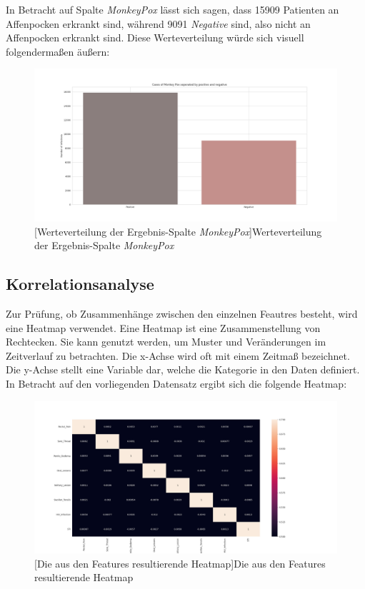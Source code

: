 \documentclass[13pt,a4paper, listof=entryprefix, bibliography=totocnumbered,toc=listofnumbered,lof=listofnumbered]{scrartcl}
\begin{document}
In Betracht auf Spalte \textit{MonkeyPox} lässt sich sagen, dass 15909 Patienten an Affenpocken erkrankt sind, während 9091 \textit{Negative} sind,
also nicht an Affenpocken erkrankt sind. Diese Werteverteilung würde sich visuell folgendermaßen äußern:

	\begin{figure}[H]
		\centering
		\includegraphics[width=0.8\linewidth]{Bilder/monkey_pox_plot.png}
		[Werteverteilung der Ergebnis-Spalte \textit{MonkeyPox}]{Werteverteilung der Ergebnis-Spalte \textit{MonkeyPox}}
		\label{fig:monkey_pox_plot}
	\end{figure}

	\subsection{Korrelationsanalyse}
		\label{ch:korrleations_analyse}

Zur Prüfung, ob Zusammenhänge zwischen den einzelnen Feautres besteht, wird eine Heatmap verwendet. 
Eine Heatmap ist eine Zusammenstellung von Rechtecken. Sie kann genutzt werden, um Muster und Veränderungen im
Zeitverlauf zu betrachten. Die x-Achse wird oft mit einem Zeitmaß bezeichnet. Die y-Achse stellt eine Variable dar, 
welche die Kategorie in den Daten definiert. In Betracht auf den vorliegenden Datensatz ergibt sich die folgende Heatmap:

	\begin{figure}[H]
		\centering
		\includegraphics[width=0.8\linewidth]{Bilder/heat_map.png}
		[Die aus den Features resultierende Heatmap]{Die aus den Features resultierende Heatmap}
		\label{fig:heatmap}
	\end{figure}
	
\end{document}
